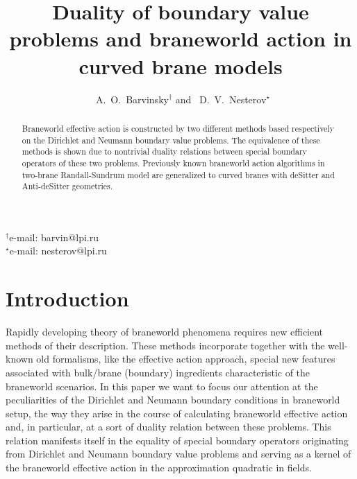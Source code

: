 \documentclass[a4paper,12pt]{article}
\begin{document}

\title{\bf Duality of boundary value problems and braneworld action
in curved brane models}
\author{~A.~O.~Barvinsky$^{\dag}$ and  ~D.~V.~Nesterov$^{\star}$}
\maketitle
 \begin{center}

  \hspace{-0mm}{\em Theory Department, Lebedev Physics
  Institute,
  Leninsky Prospect 53, Moscow 11999,\\ Russia}
 \end{center}

\begin{abstract}
Braneworld effective action is constructed by two different
methods based respectively on the Dirichlet and Neumann boundary
value problems. The equivalence of these methods is shown due to
nontrivial duality relations between special boundary operators of
these two problems. Previously known braneworld action algorithms
in two-brane Randall-Sundrum model are generalized to curved
branes with deSitter and Anti-deSitter geometries.
\end{abstract}
\noindent
$^{\dag}$e-mail: barvin@lpi.ru\\
\noindent
$^{\star}$e-mail: nesterov@lpi.ru\\


\section{Introduction}
\hspace{\parindent}Rapidly developing theory of braneworld
phenomena \cite{Ant,string,hierarchy} requires new efficient
methods of their description. These methods incorporate together
with the well-known old formalisms, like the effective action
approach, special new features associated with bulk/brane
(boundary) ingredients characteristic of the braneworld scenarios.
In this paper we want to focus our attention at the peculiarities
of the Dirichlet and Neumann boundary conditions in braneworld
setup, the way they arise in the course of calculating braneworld
effective action and, in particular, at a sort of duality relation
between these problems. This relation manifests itself in the
equality of special boundary operators originating from Dirichlet
and Neumann boundary value problems and serving as a kernel of the
braneworld effective action in the approximation quadratic in
fields.
\end{document}
